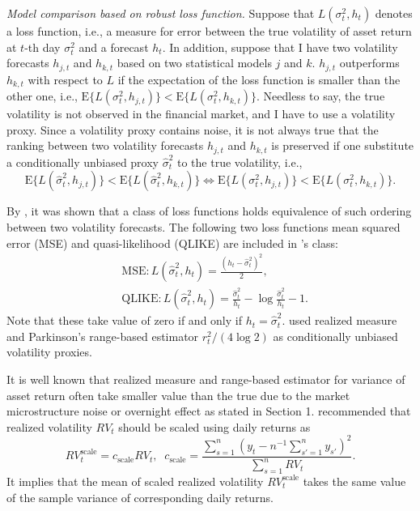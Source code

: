 \documentclass[11pt]{article}
\begin{document}
\vspace{0.5\baselineskip}

\noindent
{\it Model comparison based on robust loss function.} 
Suppose that $L(\sigma^2_t, h_{t})$ denotes a loss function, i.e., a measure for error between the true volatility of asset return at $t$-th day $\sigma^2_t$ and a forecast $h_{t}$. 
In addition, suppose that I have two volatility forecasts $h_{j,t}$ and $h_{k,t}$ based on two statistical models $j$ and $k$. 
$h_{j,t}$ outperforms $h_{k,t}$ with respect to $L$ if the expectation of the loss function is smaller than the other one, i.e., $\mathrm{E}\{L(\sigma^2_t, h_{j,t})\} < \mathrm{E}\{L(\sigma^2_t, h_{k,t})\}$. 
Needless to say, the true volatility is not observed in the financial market, and I have to use a volatility proxy. 
Since a volatility proxy contains noise, it is not always true that the ranking between two volatility forecasts $h_{j,t}$ and $h_{k,t}$ is preserved if one substitute a conditionally unbiased proxy $\widehat{\sigma}^2_t$ to the true volatility, i.e.,  
\begin{equation}
\mathrm{E}\{L(\widehat{\sigma}^2_t, h_{j,t})\} < \mathrm{E}\{L(\widehat{\sigma}^2_t, h_{k,t})\} \Longleftrightarrow
\mathrm{E}\{L(\sigma^2_t, h_{j,t})\} < \mathrm{E}\{L(\sigma^2_t, h_{k,t})\}.
\end{equation}

By \cite{Patton(2011)}, it was shown that a class of loss functions holds equivalence of such ordering between two volatility forecasts.  
The following two loss functions mean squared error (MSE) and quasi-likelihood (QLIKE) are included in \cite{Patton(2011)}'s class: 
\begin{align}
&\mathrm{MSE}: L(\widehat{\sigma}^2_t, h_t) =\frac{(h_t -\widehat{\sigma}^2_t)^2}{2},  \\
&\mathrm{QLIKE}: L(\widehat{\sigma}^2_t, h_t) =\frac{\widehat{\sigma}^2_t}{h_t} -\log\frac{\widehat{\sigma}^2_t}{h_t} -1.
\end{align}
Note that these take value of zero if and only if $h_t =\widehat{\sigma}^2_t$.  
\cite{Patton(2011)} used realized measure and Parkinson's range-based estimator $r_t^2/(4\log 2)$ as conditionally unbiased volatility proxies. 

It is well known that realized measure and range-based estimator for variance of asset return often take smaller value than the true due to the market microstructure noise or overnight effect as stated in Section 1. 
\cite{HansenLunde(2006)} recommended that realized volatility $RV_t$ should be scaled using daily returns as 
\begin{equation}
RV_t^{\mathrm{scale}} =c_{\mathrm{scale}}RV_t, \;\; c_{\mathrm{scale}}=\frac{\sum_{s=1}^n (y_t -n^{-1}\sum_{s'=1}^ny_{s'})^2}{\sum_{s=1}^nRV_t}.
\end{equation}
It implies that the mean of scaled realized volatility $RV_t^{\mathrm{scale}}$ takes the same value of the sample variance of corresponding daily returns. 
\end{document}
